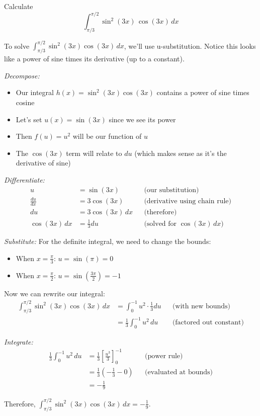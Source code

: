 \documentclass{article}
\begin{document}
  \begin{exercise}
    Calculate 
    \begin{equation}
      \int_{\pi/3}^{\pi/2} \sin^2 (3x) \, \cos(3x) \,dx
    \end{equation}
  \end{exercise}
  \begin{solution}
    To solve $\int_{\pi/3}^{\pi/2} \sin^2(3x) \cos(3x) \,dx$, we'll use u-substitution. Notice this looks like a power of sine times its derivative (up to a constant).
    
    \textit{Decompose:}
    \begin{itemize}
      \item Our integral $h(x) = \sin^2(3x) \cos(3x)$ contains a power of sine times cosine
      \item Let's set $u(x) = \sin(3x)$ since we see its power
      \item Then $f(u) = u^2$ will be our function of $u$
      \item The $\cos(3x)$ term will relate to $du$ (which makes sense as it's the derivative of sine)
    \end{itemize}

    \textit{Differentiate:}
    \begin{align*}
      u &= \sin(3x) && \text{(our substitution)} \\
      \frac{du}{dx} &= 3\cos(3x) && \text{(derivative using chain rule)} \\
      du &= 3\cos(3x)\,dx && \text{(therefore)} \\
      \cos(3x)\,dx &= \frac{1}{3}du && \text{(solved for $\cos(3x)\,dx$)}
    \end{align*}

    \textit{Substitute:}
    For the definite integral, we need to change the bounds:
    \begin{itemize}
      \item When $x = \frac{\pi}{3}$: $u = \sin(\pi) = 0$
      \item When $x = \frac{\pi}{2}$: $u = \sin(\frac{3\pi}{2}) = -1$
    \end{itemize}
    
    Now we can rewrite our integral:
    \begin{align*}
      \int_{\pi/3}^{\pi/2} \sin^2(3x) \cos(3x) \,dx &= \int_0^{-1} u^2 \cdot \frac{1}{3}du && \text{(with new bounds)} \\
      &= \frac{1}{3}\int_0^{-1} u^2 \,du && \text{(factored out constant)}
    \end{align*}

    \textit{Integrate:}
    \begin{align*}
      \frac{1}{3}\int_0^{-1} u^2 \,du &= \frac{1}{3}\left[\frac{u^3}{3}\right]_0^{-1} && \text{(power rule)} \\
      &= \frac{1}{3}\left(-\frac{1}{3} - 0\right) && \text{(evaluated at bounds)} \\
      &= -\frac{1}{9}
    \end{align*}

    Therefore, $\int_{\pi/3}^{\pi/2} \sin^2(3x) \cos(3x) \,dx = -\frac{1}{9}$.
  \end{solution}
\end{document}
